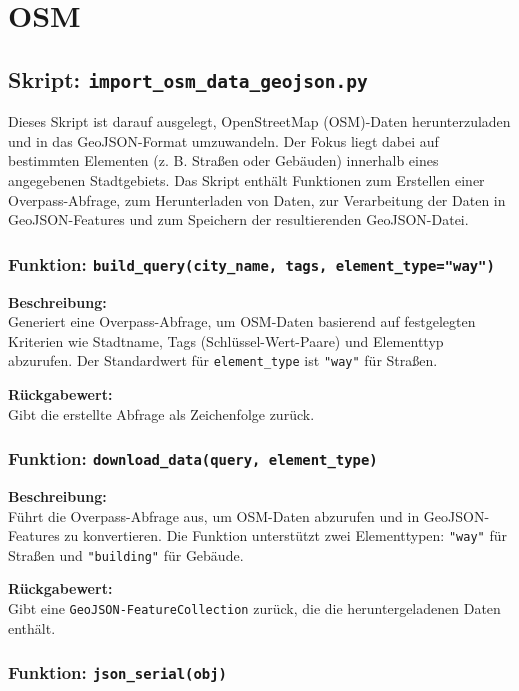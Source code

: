 \section{OSM}

\subsection{Skript: \texttt{import\_osm\_data\_geojson.py}}

Dieses Skript ist darauf ausgelegt, OpenStreetMap (OSM)-Daten herunterzuladen und in das GeoJSON-Format umzuwandeln. Der Fokus liegt dabei auf bestimmten Elementen (z. B. Straßen oder Gebäuden) innerhalb eines angegebenen Stadtgebiets. Das Skript enthält Funktionen zum Erstellen einer Overpass-Abfrage, zum Herunterladen von Daten, zur Verarbeitung der Daten in GeoJSON-Features und zum Speichern der resultierenden GeoJSON-Datei.

\subsubsection{Funktion: \texttt{build\_query(city\_name, tags, element\_type="way")}}

\textbf{Beschreibung:}\\
Generiert eine Overpass-Abfrage, um OSM-Daten basierend auf festgelegten Kriterien wie Stadtname, Tags (Schlüssel-Wert-Paare) und Elementtyp abzurufen. Der Standardwert für \texttt{element\_type} ist \texttt{"way"} für Straßen.

\textbf{Rückgabewert:}\\
Gibt die erstellte Abfrage als Zeichenfolge zurück.

\subsubsection{Funktion: \texttt{download\_data(query, element\_type)}}

\textbf{Beschreibung:}\\
Führt die Overpass-Abfrage aus, um OSM-Daten abzurufen und in GeoJSON-Features zu konvertieren. Die Funktion unterstützt zwei Elementtypen: \texttt{"way"} für Straßen und \texttt{"building"} für Gebäude.

\textbf{Rückgabewert:}\\
Gibt eine \texttt{GeoJSON-FeatureCollection} zurück, die die heruntergeladenen Daten enthält.

\subsubsection{Funktion: \texttt{json\_serial(obj)}}

